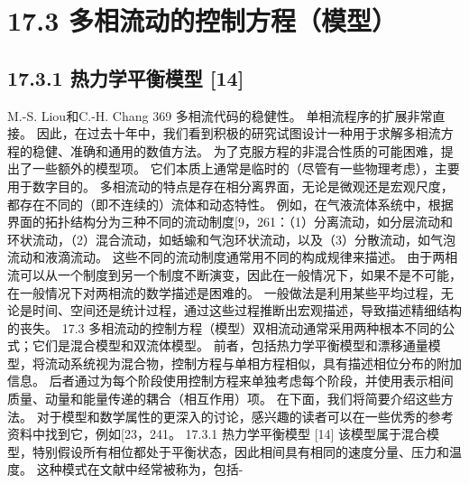 \documentclass[UTF8,11pt,a4paper,openany,fontset=fandol]{ctexbook}
\begin{document}
\section{17.3 多相流动的控制方程（模型）}
\subsection{17.3.1 热力学平衡模型 [14]}
M.-S. Liou和C.-H. Chang 369 多相流代码的稳健性。 单相流程序的扩展非常直接。 因此，在过去十年中，我们看到积极的研究试图设计一种用于求解多相流方程的稳健、准确和通用的数值方法。 为了克服方程的非混合性质的可能困难，提出了一些额外的模型项。 它们本质上通常是临时的（尽管有一些物理考虑），主要用于数字目的。 多相流动的特点是存在相分离界面，无论是微观还是宏观尺度，都存在不同的（即不连续的）流体和动态特性。 例如，在气液流体系统中，根据界面的拓扑结构分为三种不同的流动制度[9，261：（1）分离流动，如分层流动和环状流动，（2）混合流动，如蛞蝓和气泡环状流动，以及（3）分散流动，如气泡流动和液滴流动。 这些不同的流动制度通常用不同的构成规律来描述。 由于两相流可以从一个制度到另一个制度不断演变，因此在一般情况下，如果不是不可能，在一般情况下对两相流的数学描述是困难的。 一般做法是利用某些平均过程，无论是时间、空间还是统计过程，通过这些过程推断出宏观描述，导致描述精细结构的丧失。 17.3 多相流动的控制方程（模型）双相流动通常采用两种根本不同的公式；它们是混合模型和双流体模型。 前者，包括热力学平衡模型和漂移通量模型，将流动系统视为混合物，控制方程与单相方程相似，具有描述相位分布的附加信息。 后者通过为每个阶段使用控制方程来单独考虑每个阶段，并使用表示相间质量、动量和能量传递的耦合（相互作用）项。 在下面，我们将简要介绍这些方法。 对于模型和数学属性的更深入的讨论，感兴趣的读者可以在一些优秀的参考资料中找到它，例如[23，241。 17.3.1 热力学平衡模型 [14] 该模型属于混合模型，特别假设所有相位都处于平衡状态，因此相间具有相同的速度分量、压力和温度。 这种模式在文献中经常被称为，包括-
\end{document}
